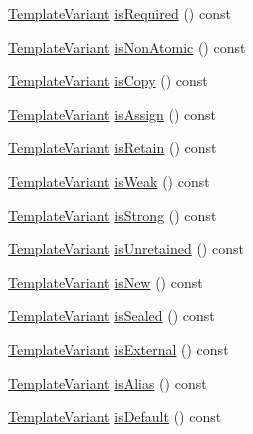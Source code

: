 \begin{DoxyCompactItemize}
\item 
\hyperlink{class_template_variant}{Template\+Variant} \hyperlink{class_member_context_1_1_private_a1bd3569e874df169582560c8117d7a71}{is\+Required} () const 
\item 
\hyperlink{class_template_variant}{Template\+Variant} \hyperlink{class_member_context_1_1_private_ad68a9f6dca00b5c8cd1132fb53d49527}{is\+Non\+Atomic} () const 
\item 
\hyperlink{class_template_variant}{Template\+Variant} \hyperlink{class_member_context_1_1_private_a4ad5a65be0d03325f7be74d89def88cb}{is\+Copy} () const 
\item 
\hyperlink{class_template_variant}{Template\+Variant} \hyperlink{class_member_context_1_1_private_a3ccb1fdacc5837209570b9e2aa52737e}{is\+Assign} () const 
\item 
\hyperlink{class_template_variant}{Template\+Variant} \hyperlink{class_member_context_1_1_private_ac2436f8000dada10980cc0ec90fed6e9}{is\+Retain} () const 
\item 
\hyperlink{class_template_variant}{Template\+Variant} \hyperlink{class_member_context_1_1_private_a17b8ff2e4a611b0cb786b4e20ce98e5a}{is\+Weak} () const 
\item 
\hyperlink{class_template_variant}{Template\+Variant} \hyperlink{class_member_context_1_1_private_ad7a6ed9f90e6703cd4df62b4c00e4e2b}{is\+Strong} () const 
\item 
\hyperlink{class_template_variant}{Template\+Variant} \hyperlink{class_member_context_1_1_private_ae1370541ad241a10d4c29aa1ee33f14e}{is\+Unretained} () const 
\item 
\hyperlink{class_template_variant}{Template\+Variant} \hyperlink{class_member_context_1_1_private_a916ad2d06ddc65975d0d3b8b31edabba}{is\+New} () const 
\item 
\hyperlink{class_template_variant}{Template\+Variant} \hyperlink{class_member_context_1_1_private_a62c984400d8a2272dbb255abc9b80337}{is\+Sealed} () const 
\item 
\hyperlink{class_template_variant}{Template\+Variant} \hyperlink{class_member_context_1_1_private_a9dc4a870c9e012f082c0b1cbbc834546}{is\+External} () const 
\item 
\hyperlink{class_template_variant}{Template\+Variant} \hyperlink{class_member_context_1_1_private_a380b5a745372c450a4fe8cc6b201d9e1}{is\+Alias} () const 
\item 
\hyperlink{class_template_variant}{Template\+Variant} \hyperlink{class_member_context_1_1_private_af1de9da577fdd06f20f9a0da44626339}{is\+Default} () const 

\end{DoxyCompactItemize}
